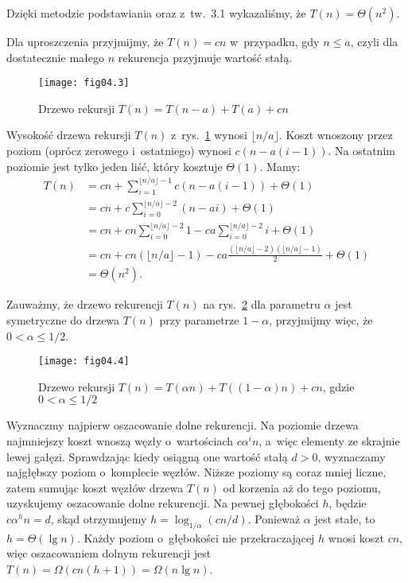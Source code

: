 Dzięki metodzie podstawiania oraz z~tw.~3.1 wykazaliśmy, że $T(n)=\Theta(n^2)$.

\exercise %
Dla uproszczenia przyjmijmy, że $T(n)=cn$ w~przypadku, gdy $n\le a$, czyli dla dostatecznie małego $n$ rekurencja przyjmuje wartość stałą.
\begin{figure}[ht]
	\begin{center}
		\texttt{[image: fig04.3]}
	\end{center}
	\caption{Drzewo rekursji $T(n)=T(n-a)+T(a)+cn$} \label{fig:4.2-4}
\end{figure}
Wysokość drzewa rekursji $T(n)$ z~rys.~\ref{fig:4.2-4} wynosi $\lfloor n/a\rfloor$. Koszt wnoszony przez  poziom (oprócz zerowego i~ostatniego) wynosi $c(n-a(i-1))$. Na ostatnim poziomie jest tylko jeden liść, który kosztuje $\Theta(1)$. Mamy:
\begin{align*}
	T(n) &= cn+\sum_{i=1}^{\lfloor n/a\rfloor-1}c(n-a(i-1))+\Theta(1) \\
	&= cn+c\sum_{i=0}^{\lfloor n/a\rfloor-2}(n-ai)+\Theta(1) \\
	&= cn+cn\sum_{i=0}^{\lfloor n/a\rfloor-2}1-ca\sum_{i=0}^{\lfloor n/a\rfloor-2}i+\Theta(1) \\
	&= cn+cn(\lfloor n/a\rfloor-1)-ca\frac{(\lfloor n/a\rfloor-2)(\lfloor n/a\rfloor-1)}{2}+\Theta(1) \\[2mm]
	&= \Theta(n^2).
\end{align*}

\exercise %
Zauważmy, że drzewo rekurencji $T(n)$ na rys.~\ref{fig:4.2-5} dla parametru $\alpha$ jest symetryczne do drzewa $T(n)$ przy parametrze $1-\alpha$, przyjmijmy więc, że $0<\alpha\le1/2$.
\begin{figure}[ht]
	\begin{center}
		\texttt{[image: fig04.4]}
	\end{center}
	\caption{Drzewo rekursji $T(n)=T(\alpha n)+T((1-\alpha)n)+cn$, gdzie $0<\alpha\le1/2$} \label{fig:4.2-5}
\end{figure}

Wyznaczmy najpierw oszacowanie dolne rekurencji. Na  poziomie drzewa najmniejszy koszt wnoszą węzły o~wartościach $c\alpha^in$, a~więc elementy ze skrajnie lewej gałęzi. Sprawdzając kiedy osiągną one wartość stałą $d>0$, wyznaczamy najgłębszy poziom o~komplecie węzłów. Niższe poziomy są coraz mniej liczne, zatem sumując koszt węzłów drzewa $T(n)$ od korzenia aż do tego poziomu, uzyskujemy oszacowanie dolne rekurencji. Na pewnej głębokości $h$, będzie $c\alpha^hn=d$, skąd otrzymujemy $h=\log_{1/\alpha}(cn/d)$. Ponieważ $\alpha$ jest stałe, to $h=\Theta(\lg n)$. Każdy poziom o~głębokości nie przekraczającej $h$ wnosi koszt $cn$, więc oszacowaniem dolnym rekurencji jest $T(n)=\Omega(cn(h+1))=\Omega(n\lg n)$.

